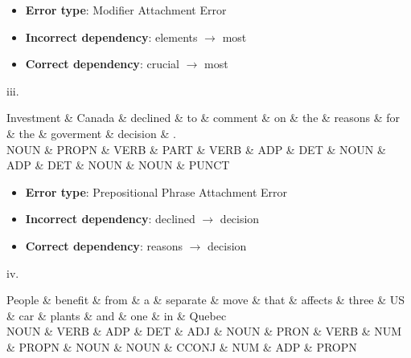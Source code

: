 {\color{red}
\begin{itemize}
    \item \textbf{Error type}: Modifier Attachment Error
    \item \textbf{Incorrect dependency}: elements $\rightarrow$ most
    \item \textbf{Correct dependency}: crucial $\rightarrow$ most
\end{itemize}
}


\medskip

iii. \\
\begin{center}
 {\small

 \begin{dependency}[] 
 \begin{deptext}
Investment \& Canada \& declined \& to \& comment \& on \& the \& reasons \& for \& the \& goverment \& decision \& . \\
NOUN \& PROPN \& VERB \& PART \& VERB \& ADP \& DET \& NOUN \& ADP \& DET \& NOUN \& NOUN \& PUNCT \\
\end{deptext}
\end{dependency}

 }
 \end{center}
{\color{red}
\begin{itemize}
    \item \textbf{Error type}: Prepositional Phrase Attachment Error
    \item \textbf{Incorrect dependency}: declined $\rightarrow$ decision
    \item \textbf{Correct dependency}: reasons $\rightarrow$ decision
\end{itemize}
}
iv. \\
 \begin{center}
 {\small
 \begin{dependency}[] 
 \begin{deptext}
People \& benefit \& from \& a \& separate \& move \& that \& affects \& three \& US \& car \& plants \& and \& one \& in \& Quebec \\
NOUN \& VERB \& ADP \& DET \& ADJ \& NOUN \& PRON \& VERB \& NUM \& PROPN \& NOUN \& NOUN \& CCONJ \& NUM \& ADP \& PROPN \\
\end{deptext}
\end{dependency}
 }
 \end{center}
